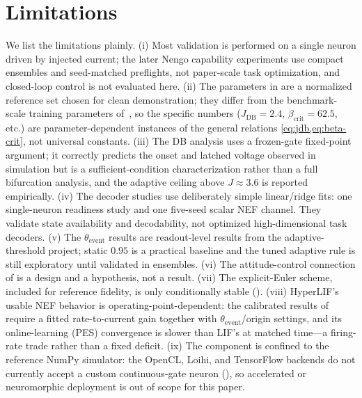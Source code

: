 \documentclass[11pt]{article}
\newcommand{\thetaevent}{\theta_{\mathrm{event}}}
\newcommand{\Jdb}{J_{\mathrm{DB}}}
\begin{document}
\section{Limitations}\label{sec:limitations}
We list the limitations plainly. (i) Most validation is performed on a single
neuron driven by injected current; the later Nengo capability experiments use
compact ensembles and seed-matched preflights, not paper-scale task optimization,
and closed-loop control is not evaluated here. (ii) The parameters in
 are a
normalized reference set chosen for clean demonstration; they differ from the
benchmark-scale training parameters of~\cite{hyperlif_theory}, so the specific
numbers ($\Jdb=2.4$, $\beta_{\mathrm{crit}}=62.5$, etc.) are parameter-dependent
instances of the general relations \cref{eq:jdb,eq:beta-crit}, not universal
constants. (iii) The DB analysis uses a frozen-gate fixed-point argument; it
correctly predicts the onset and latched voltage observed in simulation but is a
sufficient-condition characterization rather than a full bifurcation analysis,
and the adaptive ceiling above $J\approx 3.6$ is reported empirically. (iv) The
decoder studies use deliberately simple linear/ridge fits: one single-neuron
readiness study and one five-seed scalar NEF channel. They validate state
availability and decodability, not optimized high-dimensional task decoders. (v) The
\(\thetaevent\) results are readout-level results from the adaptive-threshold
project; static \(0.95\) is a practical baseline and the tuned adaptive rule is
still exploratory until validated in ensembles. (vi) The
attitude-control connection of  is a design and a hypothesis,
not a result. (vii) The explicit-Euler scheme, included for reference fidelity,
is only conditionally stable (). (viii) HyperLIF's
usable NEF behavior is operating-point-dependent: the calibrated results of
 require a fitted rate-to-current gain together with
\(\thetaevent\)/origin settings, and its online-learning (PES) convergence is
slower than LIF's at matched time---a firing-rate trade rather than a fixed
deficit. (ix) The component is confined to the reference NumPy simulator: the
OpenCL, Loihi, and TensorFlow backends do not currently accept a custom
continuous-gate neuron (), so accelerated or
neuromorphic deployment is out of scope for this paper.

\end{document}
